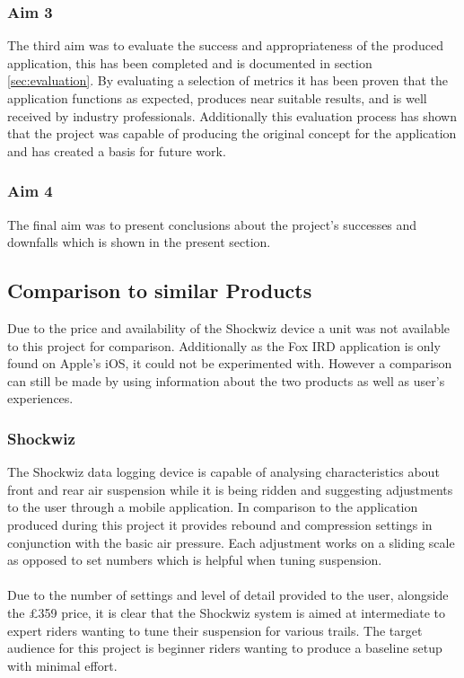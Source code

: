 		\subsubsection{Aim 3}
			The third aim was to evaluate the success and appropriateness of the produced application, this has been completed and is documented in section \ref{sec:evaluation}. By evaluating a selection of metrics it has been proven that the application functions as expected, produces near suitable results, and is well received by industry professionals. Additionally this evaluation process has shown that the project was capable of producing the original concept for the application and has created a basis for future work.
		\subsubsection{Aim 4}
			The final aim was to present conclusions about the project's successes and downfalls which is shown in the present section.
	\subsection{Comparison to similar Products}
		Due to the price and availability of the Shockwiz device a unit was not available to this project for comparison. Additionally as the Fox IRD application is only found on Apple's iOS, it could not be experimented with. However a comparison can still be made by using information about the two products as well as user's experiences.
		\subsubsection{Shockwiz}
			The Shockwiz data logging device \citep{quarq2017shockwiz} is capable of analysing characteristics about front and rear air suspension while it is being ridden and suggesting adjustments to the user through a mobile application. In comparison to the application produced during this project it provides rebound and compression settings in conjunction with the basic air pressure. Each adjustment works on a sliding scale as opposed to set numbers which is helpful when tuning suspension.
			\\\\
			Due to the number of settings and level of detail provided to the user, alongside the £359 price, it is clear that the Shockwiz system is aimed at intermediate to expert riders wanting to tune their suspension for various trails. The target audience for this project is beginner riders wanting to produce a baseline setup with minimal effort. 
